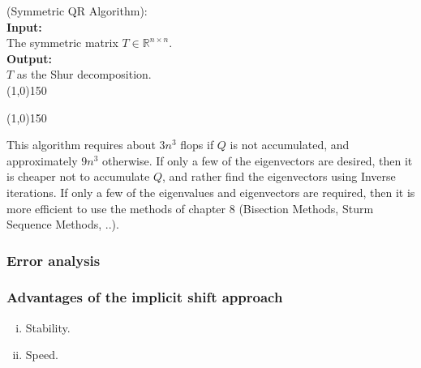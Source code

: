 \begin{algo}
{
%
	(Symmetric QR Algorithm):
%
}\\
\textbf{Input: }
{
%
	\\The symmetric matrix $T\in\mathbb R^{n\times n}$.
%
}\\
\textbf{Output: }
{
%
	\\$T$ as the Shur decomposition.
%
}\\
\line(1,0){150}
\begin{algorithmic}
%
		\EndIf{}
	\EndFor{}
	\EndIf{}
\EndWhile{}
%
\end{algorithmic}
\label{algQRAlgorithm}
\line(1,0){150}
\end{algo}
This algorithm requires about $3n^3$ flops if $Q$ is not accumulated, 
and approximately $9n^3$ otherwise.
%
If only a few of the eigenvectors are desired, then it is cheaper not to accumulate $Q$, 
and rather find the eigenvectors using Inverse iterations.
%
If only a few of the eigenvalues and eigenvectors are required, then it is more efficient to use
the methods of chapter 8 (Bisection Methods, Sturm Sequence Methods, ..).

\subsubsection*{Error analysis}

\subsubsection*{Advantages of the implicit shift approach}

\begin{enumerate}[(i):]
\item Stability.
\item Speed.
\end{enumerate}


